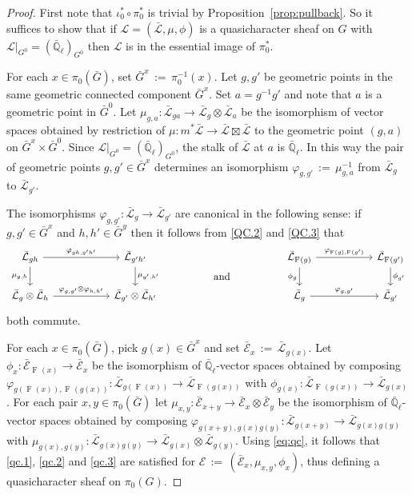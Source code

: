 \documentclass{amsart}
\theoremstyle{plain}
\theoremstyle{definition}
\theoremstyle{remark}
\newcommand{\EE}{\mathbb{\bar Q}_\ell}
\newcommand{\Frob}[1]{\operatorname{F}_{#1}}
\newcommand{\ceq}{{\, :=\, }}
\newcommand{\qcs}[1]{{\mathcal{#1}}}
\newcommand{\gqcs}[1]{{\mathcal{\bar #1}}}
\newcommand{\bG}{\bar{G}}
\begin{document}
\begin{proof}
First note that $\iota_0^* \circ \pi_0^*$ is trivial by Proposition~\ref{prop:pullback}.
So it suffices to show that if $\qcs{L} = (\gqcs{L},\mu,\phi)$ is a quasicharacter sheaf on $G$ 
with $\qcs{L}\vert_{G^0} = (\EE)_{G^0}$ then $\qcs{L}$ is in the essential image of $\pi_0^*$.

For each $x\in \pi_0(\bG)$, set $\bG^x \ceq \pi_0^{-1}(x)$.
Let $g, g'$ be geometric points in the same 
geometric connected component $\bG^x$. 
Set $a = g^{-1}g'$ and note that $a$ is a geometric point in $\bG^0$. 
Let $\mu_{g,a} : \gqcs{L}_{ga} \to \gqcs{L}_g \otimes \gqcs{L}_a$ 
be the isomorphism of vector spaces obtained by restriction of 
$\mu : m^*\gqcs{L} \to \gqcs{L} \boxtimes \gqcs{L}$ to the 
geometric point $(g,a)$ on $\bG^x \times \bG^0$. 
Since $\qcs{L}\vert_{G^0} = (\EE)_{G^0}$, 
the stalk of $\gqcs{L}$ at $a$ is $\EE$. 
In this way the pair of geometric points $g, g' \in \bG^x$ 
determines an isomorphism $\varphi_{g,g'} \ceq \mu_{g,a}^{-1}$ 
from $\gqcs{L}_{g}$ to $\gqcs{L}_{g'}$. 

The isomorphisms $\varphi_{g,g'}: \gqcs{L}_{g} \to \gqcs{L}_{g'}$ are canonical 
in the following sense: if $g,g'\in \bG^x$ and $h,h'\in \bG^y$ 
then it follows from \ref{QC.2} and \ref{QC.3} 
that
 \begin{equation}\label{eq:qc}
  \begin{tikzcd}[column sep=55]
   \gqcs{L}_{gh} \arrow{r}{\varphi_{gh,g'h'}} \arrow[swap]{d}{\mu_{g,h}}
  & \gqcs{L}_{g'h'} \arrow{d}{\mu_{g',h'}}
  &\arrow[draw=none]{d}[pos=.4,description]{\text{\normalsize{and}}} 
  &  \gqcs{L}_{\Frob{}(g)} \arrow{r}{\varphi_{\Frob{}(g),\Frob{}(g')}} \arrow[swap]{d}{\phi_{g}} & \gqcs{L}_{\Frob{}(g')} \arrow{d}{\phi_{g'}} \\
  \gqcs{L}_{g} \otimes \gqcs{L}_{h} \arrow{r}{\varphi_{g,g'}\otimes \varphi_{h,h'}}  
  & \gqcs{L}_{g'} \otimes \gqcs{L}_{h'} 
  & {}
  & \gqcs{L}_{g} \arrow{r}{\varphi_{g,g'}} & \gqcs{L}_{g'}
  \end{tikzcd}
 \end{equation}
both commute.

For each $x\in \pi_0(\bG)$, pick $g(x)\in \bG^x$ 
and set $\gqcs{E}_x \ceq \gqcs{L}_{g(x)}$. 
Let $\phi_x : \gqcs{E}_{\Frob{}(x)} \to \gqcs{E}_x$ 
be the isomorphism of $\EE$-vector spaces obtained by composing 
$\varphi_{g(\Frob{}(x)),\Frob{}(g(x))} : \gqcs{L}_{g(\Frob{}(x))} \to \gqcs{L}_{\Frob{}(g(x))}$ 
with $\phi_{g(x)} : \gqcs{L}_{\Frob{}(g(x))} \to \gqcs{L}_{g(x)}$. 
For each pair $x,y\in \pi_0(\bG)$ 
let $\mu_{x,y} : \gqcs{E}_{x+y}\to \gqcs{E}_x\otimes \gqcs{E}_y$ 
be the isomorphism of $\EE$-vector spaces obtained by composing
$\varphi_{g(x+y),g(x)g(y)} : \gqcs{L}_{g(x+y)} \to \gqcs{L}_{g(x)g(y)}$ 
with $\mu_{g(x),g(y)} : \gqcs{L}_{g(x)g(y)} \to \gqcs{L}_{g(x)}\otimes \gqcs{L}_{g(y)}$.
Using \eqref{eq:qc}, it follows that \ref{qc.1}, \ref{qc.2} and \ref{qc.3} are satisfied for
$\qcs{E} \ceq (\gqcs{E}_x, \mu_{x,y}, \phi_x)$, thus defining a quasicharacter sheaf on $\pi_0(G)$.


\end{proof}
\end{document}
